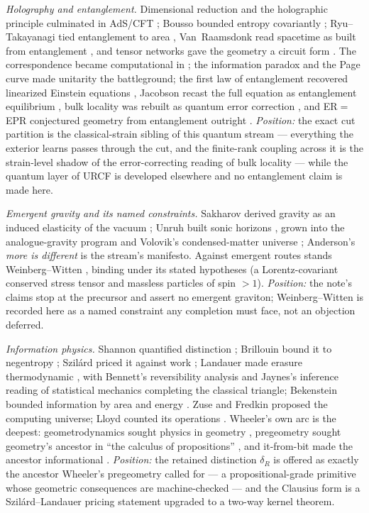\documentclass[10pt,twocolumn]{article}
\theoremstyle{definition}
\begin{document}
\emph{Holography and entanglement.} Dimensional reduction \cite{thooft93} and the
holographic principle \cite{susskind} culminated in AdS/CFT \cite{maldacena};
Bousso bounded entropy covariantly \cite{bousso}; Ryu--Takayanagi tied entanglement
to area \cite{rt}, Van~Raamsdonk read spacetime as built from entanglement
\cite{vanraamsdonk}, and tensor networks gave the geometry a circuit form
\cite{swingle}. The correspondence became computational in \cite{witten98,gkp};
the information paradox \cite{hawking76} and the Page curve \cite{page} made
unitarity the battleground; the first law of entanglement recovered linearized
Einstein equations \cite{faulkner}, Jacobson recast the full equation as
entanglement equilibrium \cite{jacobson2016}, bulk locality was rebuilt as quantum
error correction \cite{adh,happy}, and ER${}={}$EPR conjectured geometry from
entanglement outright \cite{erepr}. \emph{Position:} the exact cut partition is
the classical-strain sibling of this quantum stream --- everything the exterior
learns passes through the cut, and the finite-rank coupling across it is the
strain-level shadow of the error-correcting reading of bulk locality --- while the
quantum layer of URCF is developed elsewhere and no entanglement claim is made
here.

\emph{Emergent gravity and its named constraints.} Sakharov derived gravity as an
induced elasticity of the vacuum \cite{sakharov}; Unruh built sonic horizons
\cite{unruh81}, grown into the analogue-gravity program \cite{blv} and Volovik's
condensed-matter universe \cite{volovik}; Anderson's \emph{more is different}
\cite{anderson72} is the stream's manifesto. Against emergent routes stands Weinberg--Witten \cite{weinbergwitten}, binding
under its stated hypotheses (a Lorentz-covariant conserved stress tensor and
massless particles of spin ${>}1$). \emph{Position:} the note's claims stop
at the precursor and assert no emergent graviton; Weinberg--Witten is recorded
here as a named constraint any completion must face, not an objection deferred.

\emph{Information physics.} Shannon quantified distinction \cite{shannon};
Brillouin bound it to negentropy \cite{brillouin}; Szil\'ard priced it against
work \cite{szilard}; Landauer made erasure thermodynamic \cite{landauer}, with
Bennett's reversibility analysis \cite{bennett} and Jaynes's inference reading of
statistical mechanics \cite{jaynes} completing the classical triangle;
Bekenstein bounded information by area and energy \cite{bekbound}. Zuse
\cite{zuse} and Fredkin \cite{fredkin} proposed the computing universe; Lloyd
counted its operations \cite{lloyd}. Wheeler's own arc is the deepest:
geometrodynamics sought physics in geometry \cite{wheelergeo}, pregeometry
sought geometry's ancestor in ``the calculus of propositions'' \cite[ch.~44]{mtw}, and
it-from-bit made the ancestor informational \cite{wheeler}. \emph{Position:}
the retained distinction $\delta_R$ is offered as exactly the ancestor Wheeler's
pregeometry called for --- a propositional-grade primitive whose geometric
consequences are machine-checked --- and the Clausius form is a
Szil\'ard--Landauer pricing statement upgraded to a two-way kernel theorem.
\end{document}
